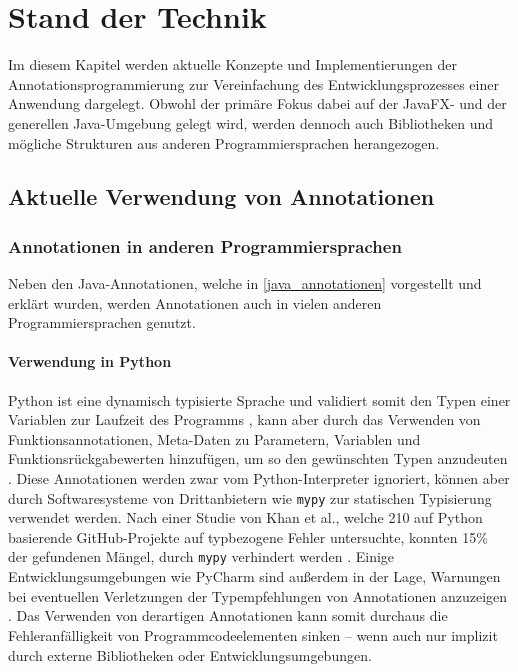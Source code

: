 \chapter{Stand der Technik}
\label{stand_der_technik}
Im diesem Kapitel werden aktuelle Konzepte und Implementierungen der Annotationsprogrammierung zur Vereinfachung des Entwicklungsprozesses einer Anwendung dargelegt. Obwohl der primäre Fokus dabei auf der JavaFX- und der generellen Java-Umgebung gelegt wird, werden dennoch auch Bibliotheken und mögliche Strukturen aus anderen Programmiersprachen herangezogen.

\section{Aktuelle Verwendung von Annotationen}
\label{aktuelle_verwendung_von_annotationen}

\subsection{Annotationen in anderen Programmiersprachen}
Neben den Java-Annotationen, welche in \autoref{java_annotationen} vorgestellt und erklärt wurden, werden Annotationen auch in vielen anderen Programmiersprachen genutzt. 
\subsubsection{Verwendung in Python}
\label{verwendung_in_python}
Python ist eine dynamisch typisierte Sprache und validiert somit den Typen einer Variablen zur Laufzeit des Programms \cite{Tratt2009}, kann aber durch das Verwenden von Funktionsannotationen, Meta-Daten zu Parametern, Variablen und Funktionsrückgabewerten hinzufügen, um so den gewünschten Typen anzudeuten \cite{Rossum2014, Winter2006}. Diese Annotationen werden zwar vom Python-Interpreter ignoriert, können aber durch Softwaresysteme von Drittanbietern wie \texttt{mypy} zur statischen Typisierung verwendet werden. Nach einer Studie von Khan et al., welche 210 auf Python basierende GitHub-Projekte auf typbezogene Fehler untersuchte, konnten 15\% der gefundenen Mängel, durch \texttt{mypy} verhindert werden \cite{Khan2021}.
Einige Entwicklungsumgebungen wie PyCharm sind außerdem in der Lage, Warnungen bei eventuellen Verletzungen der Typempfehlungen von Annotationen anzuzeigen \cite{Rother2017}. Das Verwenden von derartigen Annotationen kann somit durchaus die Fehleranfälligkeit von Programmcodeelementen sinken -- wenn auch nur implizit durch externe Bibliotheken oder Entwicklungsumgebungen.
